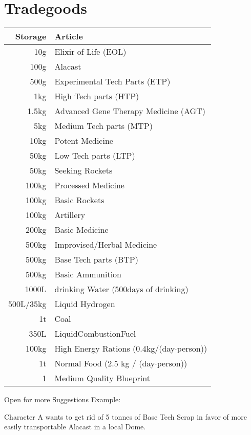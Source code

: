 \section{Tradegoods}\label{sec:tradegoods}
\begin{tabular}{|r|l|}
    \hline
    Storage & Article\\\hline
    10g & Elixir of Life (EOL)\\\hline
    100g & Alacast\\\hline
    500g & Experimental Tech Parts (ETP)\\\hline
    1kg & High Tech parts (HTP)\\\hline
    1.5kg & Advanced Gene Therapy Medicine (AGT)\\\hline
    5kg & Medium Tech parts (MTP)\\\hline
    10kg & Potent Medicine\\\hline
    50kg & Low Tech parts (LTP)\\\hline
    50kg & Seeking Rockets\\\hline
    100kg & Processed Medicine\\\hline
    100kg & Basic Rockets\\\hline
    100kg & Artillery\\\hline
    200kg & Basic Medicine\\\hline
    500kg & Improvised/Herbal Medicine\\\hline
    500kg & Base Tech parts (BTP)\\\hline
    500kg & Basic Ammunition\\\hline
    1000L & drinking Water (500days of drinking)\\\hline
    500L/35kg & Liquid Hydrogen\\\hline
    1t & Coal\\\hline
    350L & LiquidCombustionFuel\\\hline
    100kg & High Energy Rations (0.4kg/(day\(\cdot\)person))\\\hline
    1t & Normal Food (2.5 kg / (day\(\cdot\)person))\\\hline
    1 & Medium Quality Blueprint\\\hline
\end{tabular}\par
Open for more Suggestions\vspace{1.5cm}
Example:\par
Character A wants to get rid of 5 tonnes of Base Tech Scrap in favor of more easily transportable Alacast in a local
Dome.\par
